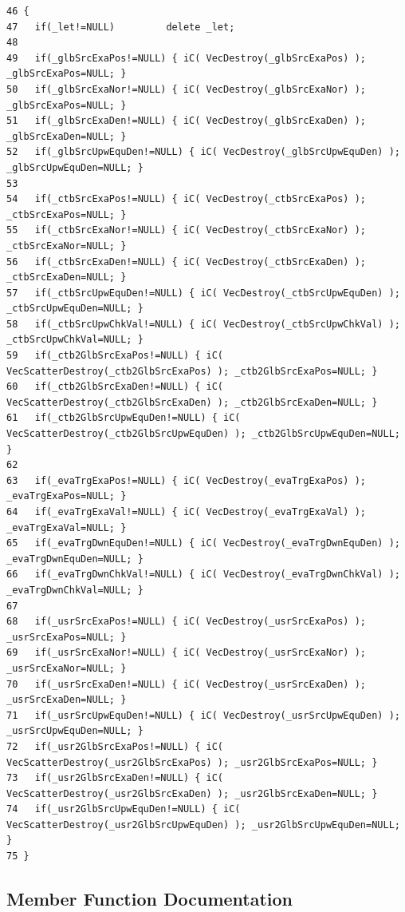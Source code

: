 \footnotesize\begin{verbatim}46 {
47   if(_let!=NULL)         delete _let;
48   
49   if(_glbSrcExaPos!=NULL) { iC( VecDestroy(_glbSrcExaPos) ); _glbSrcExaPos=NULL; }
50   if(_glbSrcExaNor!=NULL) { iC( VecDestroy(_glbSrcExaNor) ); _glbSrcExaPos=NULL; }
51   if(_glbSrcExaDen!=NULL) { iC( VecDestroy(_glbSrcExaDen) ); _glbSrcExaDen=NULL; }
52   if(_glbSrcUpwEquDen!=NULL) { iC( VecDestroy(_glbSrcUpwEquDen) ); _glbSrcUpwEquDen=NULL; }
53   
54   if(_ctbSrcExaPos!=NULL) { iC( VecDestroy(_ctbSrcExaPos) ); _ctbSrcExaPos=NULL; }
55   if(_ctbSrcExaNor!=NULL) { iC( VecDestroy(_ctbSrcExaNor) ); _ctbSrcExaNor=NULL; }
56   if(_ctbSrcExaDen!=NULL) { iC( VecDestroy(_ctbSrcExaDen) ); _ctbSrcExaDen=NULL; }
57   if(_ctbSrcUpwEquDen!=NULL) { iC( VecDestroy(_ctbSrcUpwEquDen) ); _ctbSrcUpwEquDen=NULL; }
58   if(_ctbSrcUpwChkVal!=NULL) { iC( VecDestroy(_ctbSrcUpwChkVal) ); _ctbSrcUpwChkVal=NULL; }
59   if(_ctb2GlbSrcExaPos!=NULL) { iC( VecScatterDestroy(_ctb2GlbSrcExaPos) ); _ctb2GlbSrcExaPos=NULL; }
60   if(_ctb2GlbSrcExaDen!=NULL) { iC( VecScatterDestroy(_ctb2GlbSrcExaDen) ); _ctb2GlbSrcExaDen=NULL; }
61   if(_ctb2GlbSrcUpwEquDen!=NULL) { iC( VecScatterDestroy(_ctb2GlbSrcUpwEquDen) ); _ctb2GlbSrcUpwEquDen=NULL; }
62   
63   if(_evaTrgExaPos!=NULL) { iC( VecDestroy(_evaTrgExaPos) ); _evaTrgExaPos=NULL; }
64   if(_evaTrgExaVal!=NULL) { iC( VecDestroy(_evaTrgExaVal) ); _evaTrgExaVal=NULL; }
65   if(_evaTrgDwnEquDen!=NULL) { iC( VecDestroy(_evaTrgDwnEquDen) ); _evaTrgDwnEquDen=NULL; }
66   if(_evaTrgDwnChkVal!=NULL) { iC( VecDestroy(_evaTrgDwnChkVal) ); _evaTrgDwnChkVal=NULL; }
67   
68   if(_usrSrcExaPos!=NULL) { iC( VecDestroy(_usrSrcExaPos) ); _usrSrcExaPos=NULL; }
69   if(_usrSrcExaNor!=NULL) { iC( VecDestroy(_usrSrcExaNor) ); _usrSrcExaNor=NULL; }
70   if(_usrSrcExaDen!=NULL) { iC( VecDestroy(_usrSrcExaDen) ); _usrSrcExaDen=NULL; }
71   if(_usrSrcUpwEquDen!=NULL) { iC( VecDestroy(_usrSrcUpwEquDen) ); _usrSrcUpwEquDen=NULL; }
72   if(_usr2GlbSrcExaPos!=NULL) { iC( VecScatterDestroy(_usr2GlbSrcExaPos) ); _usr2GlbSrcExaPos=NULL; }
73   if(_usr2GlbSrcExaDen!=NULL) { iC( VecScatterDestroy(_usr2GlbSrcExaDen) ); _usr2GlbSrcExaDen=NULL; }
74   if(_usr2GlbSrcUpwEquDen!=NULL) { iC( VecScatterDestroy(_usr2GlbSrcUpwEquDen) ); _usr2GlbSrcUpwEquDen=NULL; }
75 }
\end{verbatim}\normalsize 




\subsection{Member Function Documentation}
